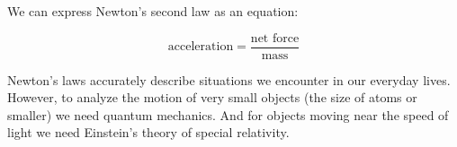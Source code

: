 We can express Newton’s second law as an equation:

\begin{tcolorbox}[colback=red!5!white,colframe=red!75!black]
  \[\text{acceleration}=\frac{\text{net force}}{\text{mass}}\]
\end{tcolorbox}

Newton's laws accurately describe situations we encounter in our everyday lives. However, to analyze the motion of very small objects (the size of atoms or smaller) we need quantum mechanics. And for objects moving near the speed of light we need Einstein's theory of special relativity.
